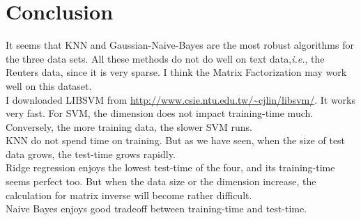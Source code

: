 \documentclass[8pt]{article}
\begin{document}
\section{Conclusion}
It seems that KNN and Gaussian-Naive-Bayes are the most robust algorithms for the three data sets.
All these methods do not do well on text data,\textit{i.e.}, the Reuters data, since it is very sparse.
I think the Matrix Factorization may work well on this dataset. \\
I downloaded LIBSVM from \url{http://www.csie.ntu.edu.tw/~cjlin/libsvm/}.
It works very fast. For SVM, the dimension does not impact training-time much.
Conversely, the more training data, the slower SVM runs. \\
KNN do not spend time on training. But as we have seen, when the size of test data grows,
the test-time grows rapidly. \\
Ridge regression enjoys the lowest test-time of the four, and its training-time seems perfect too. 
But when the data size or the dimension increase, the calculation for matrix inverse will become rather difficult.\\
Naive Bayes enjoys good tradeoff between training-time and test-time.
\end{document}
